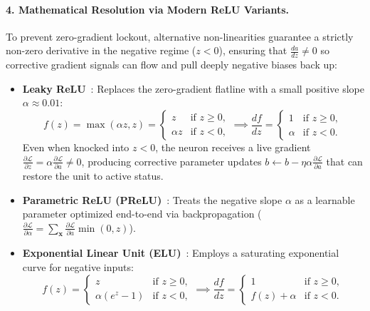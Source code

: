 \paragraph{4. Mathematical Resolution via Modern ReLU Variants.}
To prevent zero-gradient lockout, alternative non-linearities guarantee a strictly non-zero derivative in the negative regime ($z < 0$), ensuring that $\frac{da}{dz} \ne 0$ so corrective gradient signals can flow and pull deeply negative biases back up:
\begin{itemize}[leftmargin=*]
  \item \textbf{Leaky ReLU}~\cite{maas2013rectifier}: Replaces the zero-gradient flatline with a small positive slope $\alpha \approx 0.01$:
  \begin{equation}
  f(z) = \max(\alpha z, z) = \begin{cases} z & \text{if } z \ge 0, \\ \alpha z & \text{if } z < 0, \end{cases} \implies \frac{df}{dz} = \begin{cases} 1 & \text{if } z \ge 0, \\ \alpha & \text{if } z < 0. \end{cases}
  \end{equation}
  Even when knocked into $z < 0$, the neuron receives a live gradient $\frac{\partial \mathcal{L}}{\partial z} = \alpha \frac{\partial \mathcal{L}}{\partial a} \ne 0$, producing corrective parameter updates $b \leftarrow b - \eta \alpha \frac{\partial \mathcal{L}}{\partial a}$ that can restore the unit to active status.
  \item \textbf{Parametric ReLU (PReLU)}~\cite{he2015delving}: Treats the negative slope $\alpha$ as a learnable parameter optimized end-to-end via backpropagation ($\frac{\partial \mathcal{L}}{\partial \alpha} = \sum_{\mathbf{x}} \frac{\partial \mathcal{L}}{\partial a} \min(0, z)$).
  \item \textbf{Exponential Linear Unit (ELU)}~\cite{clevert2015fast}: Employs a saturating exponential curve for negative inputs:
  \begin{equation}
  f(z) = \begin{cases} z & \text{if } z \ge 0, \\ \alpha (e^z - 1) & \text{if } z < 0, \end{cases} \implies \frac{df}{dz} = \begin{cases} 1 & \text{if } z \ge 0, \\ f(z) + \alpha & \text{if } z < 0. \end{cases}

\end{equation}
\end{itemize}
